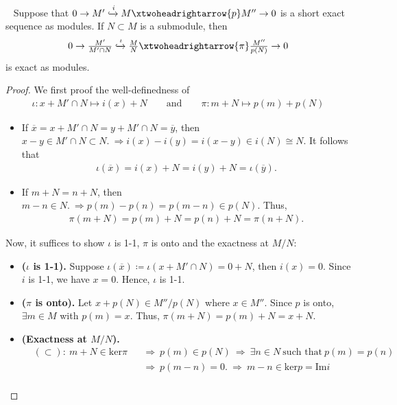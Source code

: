 \documentclass[12pt,a4paper,footinclude=true,headinclude=true]{scrbook} %
\newenvironment{lemma}[2][]
{\renewcommand\theinnercustomlemma{#2}\innercustomlemma[#1]
\begin{mdframed}[backgroundcolor=gray!20]\ }
{\end{mdframed}\endinnercustomprop}
\begin{document}
\newpage
\begin{lemma}{22}
    Suppose that $0\to M'\xhookrightarrow{i} M\xtwoheadrightarrow{p} M''\to0$ is a short exact sequence as modules. If $N\subset M$ is a submodule, then 
    \begin{align*}
        0\to \tfrac{M'}{M'\cap N}\xhookrightarrow{\iota} \tfrac{M}{N}\xtwoheadrightarrow{\pi} \tfrac{M''}{p(N)}\to 0
    \end{align*}
    is exact as modules.
\end{lemma}
\begin{proof}
    We first proof the well-definedness of
    \begin{align*}
        \iota:x+M'\cap N\mapsto i(x)+N\qquad \text{and}\qquad \pi:m+N\mapsto p(m)+p(N)
    \end{align*}
    \begin{itemize}
        \item If $\overline{x}=x+M'\cap N=y+M'\cap N=\overline{y}$, then $x-y\in M'\cap N\subset N.\ \Rightarrow i(x)-i(y)=i(x-y)\in i(N)\cong N$. It follows that
        \begin{align*}
            \iota(\overline{x})=i(x)+N=i(y)+N=\iota(\overline{y}).
        \end{align*}
        \item If $m+N=n+N$, then $m-n\in N.\ \Rightarrow p(m)-p(n)=p(m-n)\in p(N)$. Thus,
        \begin{align*}
            \pi(m+N)=p(m)+N=p(n)+N=\pi(n+N).
        \end{align*}
    \end{itemize}
    Now, it suffices to show $\iota$ is 1-1, $\pi$ is onto and the exactness at $M/N$:
    \begin{itemize}
        \item \textbf{($\iota$ is 1-1).} Suppose $\iota(\overline{x})\coloneqq\iota(x+M'\cap N)=0+N$, then $i(x)=0$. Since $i$ is 1-1, we have $x=0$. Hence, $\iota$ is 1-1. 
        \item \textbf{($\pi$ is onto).} Let $x+p(N)\in M''/p(N)$ where $x\in M''$. Since $p$ is onto, $\exists m\in M$ with $p(m)=x$. Thus, $\pi(m+N)=p(m)+N=x+N$.
        \item \textbf{(Exactness at $M/N$).} 
        \begin{align*}
            &(\subset):\ m+N\in\mathrm{ker}\pi & &\Rightarrow\ p(m)\in p(N)\ \Rightarrow\ \exists n\in N\ \text{such that}\ p(m)=p(n)\\
            & & &\Rightarrow\ p(m-n)=0.\ \Rightarrow\ m-n\in\mathrm{ker}p=\mathrm{Im}i\\

\end{align*}
\end{itemize}
\end{proof}
\end{document}
